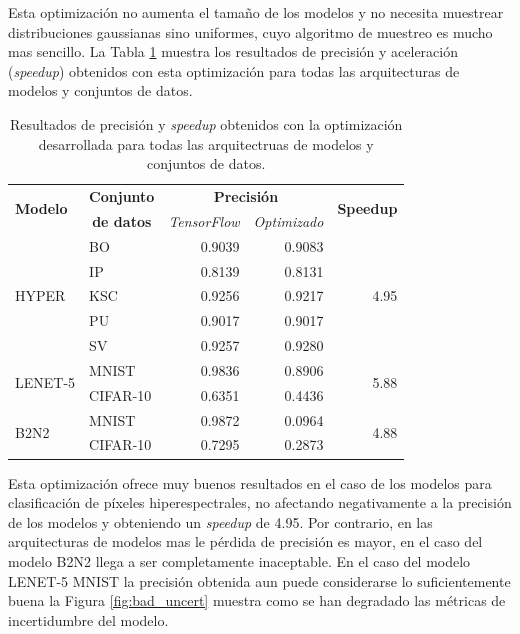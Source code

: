 Esta optimización no aumenta el tamaño de los modelos y no necesita muestrear distribuciones gaussianas sino uniformes, cuyo algoritmo de muestreo es mucho mas sencillo. La Tabla \ref{tab:uniform_opt} muestra los resultados de precisión y aceleración (\textit{speedup}) obtenidos con esta optimización para todas las arquitecturas de modelos y conjuntos de datos.

\begin{table}[h]
    \centering
    \caption{Resultados de precisión y \textit{speedup} obtenidos con la optimización desarrollada para todas las arquitectruas de modelos y conjuntos de datos.}
    \label{tab:uniform_opt}
    \begin{tabular}{llrrr}
    \hline
     \multirow{2}{*}{\textbf{Modelo}} & \textbf{Conjunto} & \multicolumn{2}{c}{\textbf{Precisión}} & \multirow{2}{*}{\textbf{Speedup}} \\
     & \multicolumn{1}{c}{\textbf{de datos}} & \multicolumn{1}{l}{\textit{TensorFlow}} & \multicolumn{1}{l}{\textit{Optimizado}} & \\ \hline
    \multirow{5}{*}{HYPER} & BO & 0.9039 & 0.9083 & \multirow{5}{*}{4.95} \\
     & IP & 0.8139 & 0.8131 & \\
     & KSC & 0.9256 & 0.9217 & \\
     & PU & 0.9017 & 0.9017 & \\
     & SV & 0.9257 & 0.9280 & \\ \hline
    \multirow{2}{*}{LENET-5} & MNIST & 0.9836 & 0.8906 & \multirow{2}{*}{5.88} \\
     & CIFAR-10 & 0.6351 & 0.4436 & \\ \hline
    \multirow{2}{*}{B2N2} & MNIST & 0.9872 & 0.0964 & \multirow{2}{*}{4.88} \\
     & CIFAR-10 & 0.7295 & 0.2873 & \\ \hline                  
    \end{tabular}
\end{table}

Esta optimización ofrece muy buenos resultados en el caso de los modelos para clasificación de píxeles hiperespectrales, no afectando negativamente a la precisión de los modelos y obteniendo un \textit{speedup} de 4.95. Por contrario, en las arquitecturas de modelos mas le pérdida de precisión es mayor, en el caso del modelo B2N2 llega a ser completamente inaceptable. En el caso del modelo LENET-5 MNIST la precisión obtenida aun puede considerarse lo suficientemente buena la Figura \ref{fig:bad_uncert} muestra como se han degradado las métricas de incertidumbre del modelo. 


